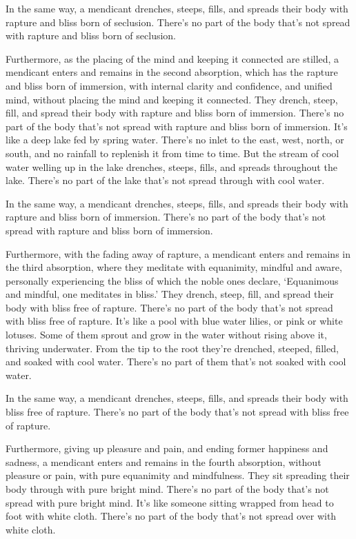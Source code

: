 \documentclass[12pt,openany]{book}%
\begin{document}
In the same way, a mendicant drenches, steeps, fills, and spreads their body with rapture and bliss born of seclusion. There’s no part of the body that’s not spread with rapture and bliss born of seclusion. 

Furthermore, as the placing of the mind and keeping it connected are stilled, a mendicant enters and remains in the second absorption, which has the rapture and bliss born of immersion, with internal clarity and confidence, and unified mind, without placing the mind and keeping it connected. They drench, steep, fill, and spread their body with rapture and bliss born of immersion. There’s no part of the body that’s not spread with rapture and bliss born of immersion. It’s like a deep lake fed by spring water. There’s no inlet to the east, west, north, or south, and no rainfall to replenish it from time to time. But the stream of cool water welling up in the lake drenches, steeps, fills, and spreads throughout the lake. There’s no part of the lake that’s not spread through with cool water. 

In the same way, a mendicant drenches, steeps, fills, and spreads their body with rapture and bliss born of immersion. There’s no part of the body that’s not spread with rapture and bliss born of immersion. 

Furthermore, with the fading away of rapture, a mendicant enters and remains in the third absorption, where they meditate with equanimity, mindful and aware, personally experiencing the bliss of which the noble ones declare, ‘Equanimous and mindful, one meditates in bliss.’ They drench, steep, fill, and spread their body with bliss free of rapture. There’s no part of the body that’s not spread with bliss free of rapture. It’s like a pool with blue water lilies, or pink or white lotuses. Some of them sprout and grow in the water without rising above it, thriving underwater. From the tip to the root they’re drenched, steeped, filled, and soaked with cool water. There’s no part of them that’s not soaked with cool water. 

In the same way, a mendicant drenches, steeps, fills, and spreads their body with bliss free of rapture. There’s no part of the body that’s not spread with bliss free of rapture. 

Furthermore, giving up pleasure and pain, and ending former happiness and sadness, a mendicant enters and remains in the fourth absorption, without pleasure or pain, with pure equanimity and mindfulness. They sit spreading their body through with pure bright mind. There’s no part of the body that’s not spread with pure bright mind. It’s like someone sitting wrapped from head to foot with white cloth. There’s no part of the body that’s not spread over with white cloth. 
\end{document}

